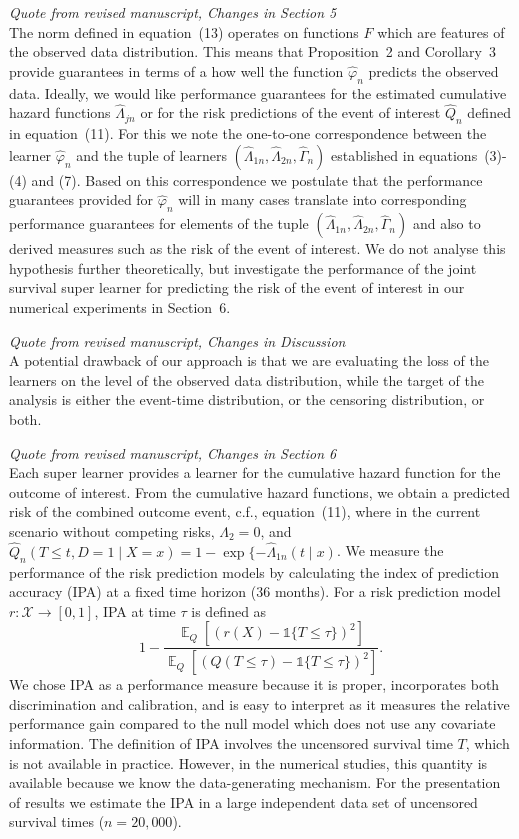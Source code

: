 \documentclass[a4paper,danish]{article}
\newcommand{\E}{{\ensuremath{\mathop{{\mathbb{E}}}}}}
\renewcommand{\phi}{\varphi}
\newcommand{\1}{\mathds{1}}
\newcommand{\qrev}[2]{
\vspace{.5em}
\begin{tcolorbox}[boxrule=0pt]
\hfill{\it\footnotesize Quote from revised manuscript#1}\\[.5em]
#2
\end{tcolorbox}
}
\begin{document}
\qrev{, Changes in Section 5}{
The norm defined in equation~(13) operates on functions \(
F \) which are features of the observed data distribution. This means
that Proposition~2 and
Corollary~3 provide guarantees in terms of a how
well the function $\hat{\phi}_n$ predicts the observed data. Ideally,
we would like performance guarantees for the estimated cumulative
hazard functions $\hat{\Lambda}_{jn}$ or for the risk predictions of
the event of interest $\hat{Q}_{n}$ defined in
equation~(11). For this we note the one-to-one
correspondence between the learner $\hat{\phi}_n$ and the tuple of
learners \((\hat \Lambda_{1n},\hat \Lambda_{2n}, \hat \Gamma_{n})\)
established in equations~(3)-(4) and
(7). Based on this correspondence we postulate that
the performance guarantees provided for $\hat{\phi}_n$ will in many
cases translate into corresponding performance guarantees for elements
of the tuple \((\hat \Lambda_{1n},\hat \Lambda_{2n}, \hat
\Gamma_{n})\) and also to derived measures such as the risk of the
event of interest. We do not analyse this hypothesis further
theoretically, but investigate the performance of the joint survival
super learner for predicting the risk of the event of interest in our
numerical experiments in Section~6.
}
\qrev{, Changes in Discussion}{
A potential drawback of our approach is that we are evaluating the
loss of the learners on the level of the observed data distribution,
while the target of the analysis is either the event-time
distribution, or the censoring distribution, or
both. \color{blue}{However, our numerical experiments show that our
approach can perform well for estimating the target of the analysis.
}}
     
\qrev{, Changes in Section 6}{
Each super learner provides a learner for the cumulative hazard
function for the outcome of interest. From the cumulative hazard
functions, we obtain a predicted risk of the combined outcome event, c.f., equation~(11), where in the current scenario without
competing risks, $\Lambda_2 = 0$, and \(\hat Q_n(T \leq t, D = 1 \mid
X=x)=1-\exp\{-\hat\Lambda_{1n}(t \mid x)\). We measure the performance
of the risk prediction models by
calculating the index of prediction accuracy (IPA)
\citep{kattan2018index} at a fixed time horizon (36 months).
For a risk
prediction model \( r \colon \mathcal{X} \rightarrow [0,1] \), IPA at
time \( \tau \) is defined as 
\begin{equation*}
  1 - \frac{\E_Q{[(r(X) - \1{\{T \leq \tau\}})^2]}}
  {\E_Q{[( Q{({T \leq \tau})} - \1{\{T \leq \tau\}})^2]}}.
\end{equation*}
We chose IPA as a performance measure because it is proper,
incorporates both discrimination and calibration, and is easy to
interpret as it measures the relative performance gain compared to the
null model which does not use any covariate information. The definition
of IPA involves the uncensored survival time \( T \), which is not
available in practice. However, in the numerical studies, this
quantity is available because we know the data-generating mechanism.
For the presentation of results we estimate the
IPA in a large independent data set of
uncensored survival times (\( n = 20,000 \)).
}
\end{document}
